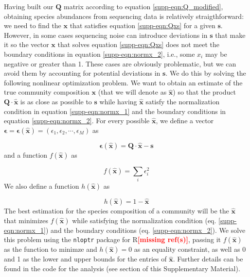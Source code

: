 \documentclass[a4paper,10pt]{article}
\newcommand{\mr}{\textcolor{red}{\textbf{[missing ref(s)]}}}
\begin{document}
Having built our $\mathbf{Q}$ matrix according to equation
\ref{supp-eqn:Q_modified}, obtaining species abundances from sequencing data
is relatively straigthforward: we need to find the $\mathbf{x}$ that satisfies
equation \ref{supp-eqn:Qxs} for a given $\mathbf{s}$. However, in some cases
sequencing noise can introduce deviations in $\mathbf{s}$ that make it so the
vector $\mathbf{x}$ that solves equation \ref{supp-eqn:Qxs} does not meet the
boundary conditions in equation \ref{supp-eqn:normx_2}, i.e., some $x_i$ may be
negative or greater than 1. These cases are obviously problematic, but we can
avoid them by accounting for potential deviations in $\mathbf{s}$. We do this
by solving the following nonlinear optimization problem. We want to obtain an estimate of the true community composition $\mathbf{x}$
(that we will denote as $\mathbf{\hat{x}}$) so that the product
$\mathbf{Q} \cdot \mathbf{\hat{x}}$ is as close as possible to $\mathbf{s}$ while
having $\mathbf{\hat{x}}$ satisfy the normalization condition in equation
\ref{supp-eqn:normx_1} and the boundary conditions in equation
\ref{supp-eqn:normx_2}. For every possible $\mathbf{\hat{x}}$, we define a vector
$\mathbf{\epsilon} = \mathbf{\epsilon} \left( \mathbf{\hat{x}} \right) = 
\left( \epsilon_1, \epsilon_2, \cdots, \epsilon_M \right)$ as

\begin{equation}
\mathbf{\epsilon} \left( \mathbf{\hat{x}} \right) =
\mathbf{Q} \cdot \mathbf{\hat{x}} - \mathbf{s}
\end{equation}
%
and a function $f \left( \mathbf{\hat{x}} \right)$ as

\begin{equation}
f \left( \mathbf{\hat{x}} \right) = \sum_i \epsilon_i^2
\end{equation}
%
We also define a function $h \left( \mathbf{\hat{x}} \right)$ as

\begin{equation}
h \left( \mathbf{\hat{x}} \right) = 1 - \mathbf{\hat{x}}
\end{equation}
%
The best estimation for the species composition of a community will be the
$\mathbf{\hat{x}}$ that minimizes $f \left( \mathbf{\hat{x}} \right)$ while
satisfying the normalization condition (eq. \ref{supp-eqn:normx_1}) and the
boundary conditions (eq. \ref{supp-eqn:normx_2}). We solve
this problem using the \texttt{nloptr} package for R\mr, passing it
$f \left( \mathbf{\hat{x}} \right)$ as the function to minimze and
$h \left( \mathbf{\hat{x}} \right) = 0$ as an equality constraint, as well as
0 and 1
as the lower and upper bounds for the entries of $\mathbf{\hat{x}}$. Further
details can be found in the code for the analysis (see section 
 of this Supplementary Material).
\end{document}

